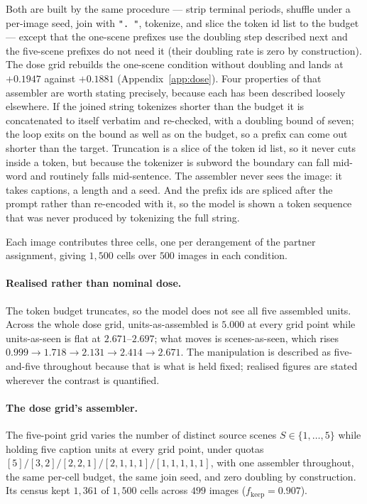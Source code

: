 Both are built by the same procedure --- strip terminal periods, shuffle under a per-image seed, join
with \texttt{". "}, tokenize, and slice the token id list to the budget --- except that the one-scene
prefixes use the doubling step described next and the five-scene prefixes do not need it (their
doubling rate is zero by construction). The dose grid rebuilds the one-scene condition without doubling
and lands at $+0.1947$ against $+0.1881$ (Appendix~\ref{app:dose}). Four properties of
that assembler are worth stating precisely, because each has been described loosely elsewhere. If the
joined string tokenizes shorter than the budget it is concatenated to itself verbatim and re-checked,
with a doubling bound of seven; the loop exits on the bound as well as on the budget, so a prefix can
come out shorter than the target. Truncation is a slice of the token id list, so it never cuts inside
a token, but because the tokenizer is subword the boundary can fall mid-word and routinely falls
mid-sentence. The assembler never sees the image: it takes captions, a length and a seed. And the
prefix ids are spliced after the prompt rather than re-encoded with it, so the model is shown a token
sequence that was never produced by tokenizing the full string.

Each image contributes three cells, one per derangement of the partner assignment, giving $1{,}500$
cells over $500$ images in each condition.

\paragraph{Realised rather than nominal dose.} The token budget truncates, so the model does not see
all five assembled units. Across the whole dose grid, units-as-assembled is $5.000$ at every grid
point while units-as-seen is flat at $2.671$--$2.697$; what moves is scenes-as-seen, which rises
$0.999 \rightarrow 1.718 \rightarrow 2.131 \rightarrow 2.414 \rightarrow 2.671$. The manipulation is
described as five-and-five throughout because that is what is held fixed; realised figures are stated
wherever the contrast is quantified.

\paragraph{The dose grid's assembler.} The five-point grid varies the number of distinct source
scenes $S \in \{1,\dots,5\}$ while holding five caption units at every grid point, under quotas
$[5] / [3,2] / [2,2,1] / [2,1,1,1] / [1,1,1,1,1]$, with one assembler throughout, the same per-cell
budget, the same join seed, and zero doubling by construction. Its census kept $1{,}361$ of $1{,}500$
cells across $499$ images ($f_{\mathrm{keep}} = 0.907$).

